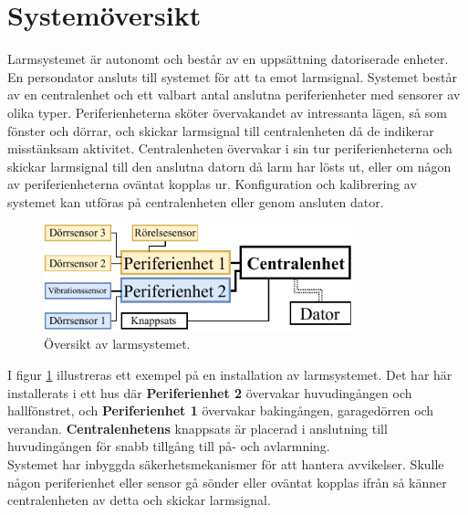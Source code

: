 \documentclass[a4paper]{article}
\begin{document}
\section*{Systemöversikt}
\label{sec:Systemöversikt}
Larmsystemet är autonomt och består av en uppsättning datoriserade enheter. En persondator ansluts till systemet för att ta emot larmsignal. Systemet består av en centralenhet och ett valbart antal anslutna periferienheter med sensorer av olika typer. Periferienheterna sköter övervakandet av intressanta lägen, så som fönster och dörrar, och skickar larmsignal till centralenheten då de indikerar misstänksam aktivitet. Centralenheten övervakar i sin tur periferienheterna och skickar larmsignal till den anslutna datorn då larm har lösts ut, eller om någon av periferienheterna oväntat kopplas ur. Konfiguration och kalibrering av systemet kan utföras på centralenheten eller genom ansluten dator.
\\

\begin{figure}
	\centering\includegraphics[width=0.8\textwidth]{figurer/systemoversiktfigur1.pdf}
	\caption{Översikt av larmsystemet.}
	\label{figur:översikt}
\end{figure}


I figur \ref{figur:översikt} illustreras ett exempel på en installation av larmsystemet. Det har här installerats i ett hus där \textbf{Periferienhet 2} övervakar huvudingången och hallfönstret, och \textbf{Periferienhet 1} övervakar bakingången, garagedörren och verandan. \textbf{Centralenhetens} knappsats är placerad i anslutning till huvudingången för snabb tillgång till på- och avlarmning.
\\

Systemet har inbyggda säkerhetsmekanismer för att hantera avvikelser. Skulle någon periferienhet eller sensor gå sönder eller oväntat kopplas ifrån så känner centralenheten av detta och skickar larmsignal.
\end{document}
